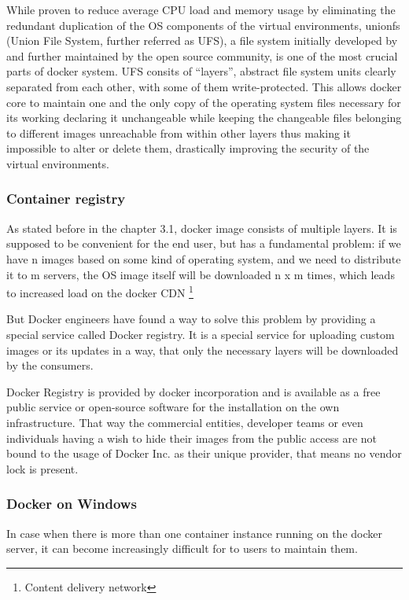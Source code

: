 While proven to reduce average CPU load and memory usage by
eliminating the redundant duplication of the OS components of the
virtual environments,
unionfs (Union File System, further referred as UFS), a file system
initially developed by and further maintained by the open source
community, is one of the most crucial parts of docker system.
UFS consits of “layers”, abstract file system units clearly separated
from each other, with some of them write-protected. This allows
docker core to maintain one and the only copy of the operating
system files necessary for its working declaring it unchangeable
while keeping the changeable files belonging to different images
unreachable from within other layers thus making it impossible to
alter or delete them, drastically improving the security of the virtual
environments.

\subsubsection{Container registry}

As stated before in the chapter 3.1, docker image consists of multiple layers.
It is supposed to be convenient for the end user,
but has a fundamental problem: if we have
n images based on some kind of operating system, and we need
to distribute it to m servers, the OS image itself will be downloaded
n x m times, which leads to increased
load on the docker CDN \footnote{Content delivery network}

But Docker engineers have found a way to solve this problem by providing
a special service called Docker registry. It is a special service for uploading
custom images or its updates in a way, that only the necessary layers will be
downloaded by the consumers.

Docker Registry is provided by docker incorporation and is available
as a free public service or open-source software
for the installation on the own infrastructure.
That way the commercial entities, developer teams or even individuals having a
wish to hide their images from the public access
are not bound to the usage of Docker Inc. as their unique provider, that means
no vendor lock is present.

\subsubsection{Docker on Windows}

In case when there is more than one container
instance running on the docker server, it can become increasingly difficult for
to users to maintain them.

